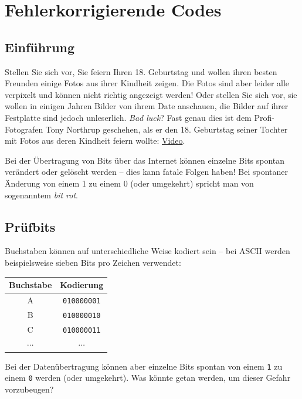 \chapter{Fehlerkorrigierende Codes}

\section{Einführung}

Stellen Sie sich vor, Sie feiern Ihren 18. Geburtstag und wollen ihren besten Freunden einige Fotos aus ihrer Kindheit zeigen. Die Fotos sind aber leider alle verpixelt und können nicht richtig angezeigt werden! Oder stellen Sie sich vor, sie wollen in einigen Jahren Bilder von ihrem Date anschauen, die Bilder auf ihrer Festplatte sind jedoch unleserlich. \textit{Bad luck}? Fast genau dies ist dem Profi-Fotografen Tony Northrup geschehen, als er den 18. Geburtstag seiner Tochter mit Fotos aus deren Kindheit feiern wollte: \href{https://www.youtube.com/watch?v=xvbnhCDfREk}{Video}.

Bei der Übertragung von Bits über das Internet können einzelne Bits spontan verändert oder gelöscht werden -- dies kann fatale Folgen haben! Bei spontaner Änderung von einem 1 zu einem 0 (oder umgekehrt) spricht man von sogenanntem \textit{bit rot}.

\section{Prüfbits}

Buchstaben können auf unterschiedliche Weise kodiert sein -- bei ASCII werden beispielsweise sieben Bits pro Zeichen verwendet:

\begin{table}[H]
    \centering
    \begin{tabular}{c|c}
        Buchstabe & Kodierung          \\\midrule\midrule
        A         & \texttt{010000001} \\\midrule
        B         & \texttt{010000010} \\\midrule
        C         & \texttt{010000011} \\\midrule
        $\cdots$  & $\cdots$
    \end{tabular}
\end{table}
Bei der Datenübertragung können aber einzelne Bits spontan von einem \texttt{1} zu einem \texttt{0} werden (oder umgekehrt). Was könnte getan werden, um dieser Gefahr vorzubeugen?

